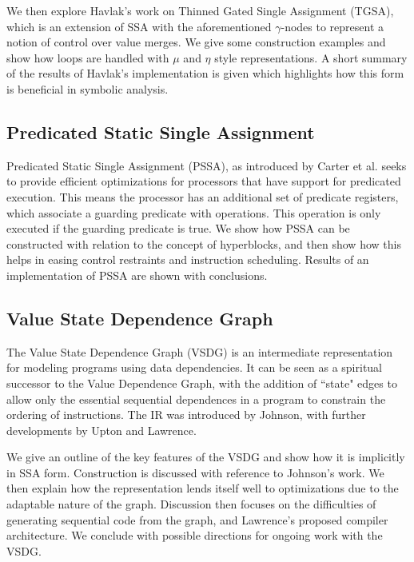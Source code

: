 We then explore Havlak's work\cite{Havlak93constructionof} on Thinned Gated Single Assignment (TGSA), which is an extension of SSA with the aforementioned $\gamma$-nodes to represent a notion of control over value merges. We give some construction examples and show how loops are handled with $\mu$ and $\eta$ style representations. A short summary of the results of Havlak's implementation is given which highlights how this form is beneficial in symbolic analysis.

\subsection*{Predicated Static Single Assignment}

Predicated Static Single Assignment (PSSA), as introduced by Carter et al.\cite{carter99predicated} seeks to provide efficient optimizations for processors that have support for predicated execution. This means the processor has an additional set of predicate registers, which associate a guarding predicate with operations. This operation is only executed if the guarding predicate is true. We show how PSSA can be constructed with relation to the concept of hyperblocks, and then show how this helps in easing control restraints and instruction scheduling. Results of an implementation of PSSA are shown with conclusions.

\subsection*{Value State Dependence Graph}

The Value State Dependence Graph (VSDG) is an intermediate representation for modeling programs using data dependencies. It can be seen as a spiritual successor to the Value Dependence Graph\cite{177907}, with the addition of ``state" edges to allow only the essential sequential dependences in a program to constrain the ordering of instructions. The IR was introduced by Johnson\cite{UCAM-CL-TR-607,johnson-combined}, with further developments by Upton\cite{upton} and Lawrence\cite{UCAM-CL-TR-705}.

We give an outline of the key features of the VSDG and show how it is implicitly in SSA form. Construction is discussed with reference to Johnson's work. We then explain how the representation lends itself well to optimizations due to the adaptable nature of the graph. Discussion then focuses on the difficulties of generating sequential code from the graph\cite{DBLP:conf/pdpta/Upton03}, and Lawrence's proposed compiler architecture. We conclude with possible directions for ongoing work with the VSDG.